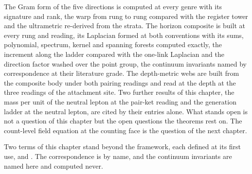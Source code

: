 The Gram form of the five directions is computed at every genre with its signature and rank, the warp from rung to rung compared with the register tower and the ultrametric re-derived from the strata. The horizon composite is built at every rung and reading, its Laplacian formed at both conventions with its sums, polynomial, spectrum, kernel and spanning forests computed exactly, the increment along the ladder compared with the one-link Laplacian and the direction factor washed over the point group, the continuum invariants named by correspondence at their literature grade. The depth-metric webs are built from the composite body under both pairing readings and read at the depth at the three readings of the attachment site. Two further results of this chapter, the mass per unit of the neutral lepton at the pair-ket reading and the generation ladder at the neutral lepton, are cited by their entries alone. What stands open is not a question of this chapter but the open questions the theorems rest on. The count-level field equation at the counting face is the question of the next chapter.
\begin{chbridge}
Two terms of this chapter stand beyond the framework, each defined at its first use,  and . The correspondence is by name, and the continuum invariants are named here and computed never.
\end{chbridge}
